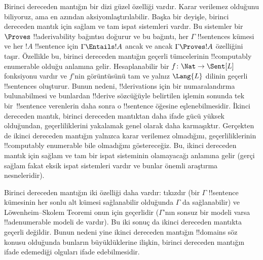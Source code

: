 \documentclass[../../../include/open-logic-section]{subfiles}
\begin{document}


Birinci dereceden mantığın bir dizi güzel özelliği vardır. Karar verilemez
olduğunu biliyoruz, ama en azından aksiyomlaştırılabilir. Başka bir
deyişle, birinci dereceden mantık için sağlam ve tam ispat sistemleri vardır.
Bu sistemler bir $\Proves$ !!a{derivability} bağıntısı doğurur ve bu bağıntı,
her $\Gamma$ !!{sentence}s kümesi ve her $!A$ !!{sentence} için
$\Gamma\Entails !A$ ancak ve ancak $\Gamma\Proves !A$ özelliğini taşır.
Özellikle bu, birinci dereceden
mantığın geçerli tümcelerinin !!{computably
  enumerable} olduğu anlamına
gelir. Hesaplanabilir bir $f\colon\Nat\to\Sent[L]$ fonksiyonu vardır ve
$f$'nin görüntüsünü tam ve yalnız $\Lang{L}$ dilinin geçerli
!!{sentence}s oluşturur. Bunun nedeni, !!{derivation}s için bir numaralandırma
bulunabilmesi ve bunlardan !!{derive} sözcüğüyle belirtilen işlemin sonunda
tek bir~!!{sentence} verenlerin
daha sonra o !!{sentence} öğesine eşlenebilmesidir. İkinci dereceden
mantık, birinci dereceden mantıktan daha ifade gücü yüksek olduğundan,
geçerliliklerini yakalamak genel olarak daha karmaşıktır. Gerçekten de ikinci
dereceden mantığın yalnızca karar verilemez olmadığını, geçerliliklerinin
!!{computably
  enumerable} bile olmadığını göstereceğiz. Bu, ikinci dereceden
mantık için sağlam ve tam bir ispat sisteminin olamayacağı anlamına gelir
(gerçi sağlam fakat eksik ispat sistemleri vardır ve bunlar önemli araştırma
nesneleridir).

Birinci dereceden mantığın iki özelliği daha vardır: tıkızdır (bir
$\Gamma$ !!{sentence} kümesinin her sonlu alt kümesi sağlanabilir olduğunda
$\Gamma$ da sağlanabilir) ve Löwenheim--Skolem Teoremi onun için geçerlidir
($\Gamma$'nın sonsuz bir modeli varsa !!a{denumerable} modeli de vardır).
Bu iki sonuç da ikinci dereceden mantıkta geçerli değildir. Bunun nedeni yine
ikinci dereceden mantığın !!{domain}s söz konusu olduğunda bunların
büyüklüklerine ilişkin, birinci dereceden mantığın ifade edemediği olguları
ifade edebilmesidir.
\end{document}
